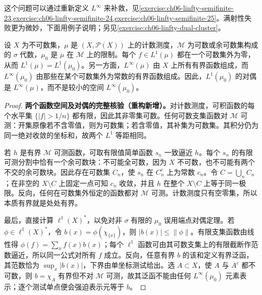 \documentclass[../../main.tex]{subfiles}
\begin{document}
这个问题可以通过重新定义 $L^\infty$ 来补救，见\cref{exercise:ch06-linfty-semifinite-23,exercise:ch06-linfty-semifinite-24,exercise:ch06-linfty-semifinite-25}。满射性失败更为微妙，下面用例子说明；另见\cref{exercise:ch06-linfty-dual-cluster}。
\begin{example}\label{example:ch06-countable-cocountable-dual}
设 $X$ 为不可数集，$\mu$ 是 $(X,\mathscr P(X))$ 上的计数测度，$\mathscr M$ 为可数或余可数集构成的 $\sigma$ 代数，$\mu_0$ 是 $\mu$ 在 $\mathscr M$ 上的限制。每个 $f\in L^1(\mu)$ 都在一个可数集外为零，从而 $L^1(\mu)=L^1(\mu_0)$。另一方面，$L^\infty(\mu)$ 由 $X$ 上所有有界函数组成，而 $L^\infty(\mu_0)$ 由那些在某个可数集外为常数的有界函数组成。因此，$L^1(\mu_0)$ 的对偶是 $L^\infty(\mu)$，而不是较小的空间 $L^\infty(\mu_0)$。
\end{example}
\begin{proof}
\textbf{两个函数空间及对偶的完整核验（重构新增）。}对计数测度，可积函数的每个水平集 $\{|f|>1/n\}$ 都有限，因此其非零集可数。任何可数支集函数对 $\mathscr M$ 可测：开集原像若不含零值，则为可数集；若含零值，其补集为可数集。其积分仍为同一绝对收敛的坐标和，故两个 $L^1$ 等距相同。

若 $h$ 是有界 $\mathscr M$ 可测函数，可取有限值简单函数 $s_n$ 一致逼近 $h$。每个 $s_n$ 的有限可测分割中恰有一个余可数块：不可能全可数，因为 $X$ 不可数，也不可能有两个不交的余可数块。因此存在可数集 $C_n$，使 $s_n$ 在 $C_n^c$ 上为常数 $c_n$。令 $C=\bigcup_n C_n$；在非空的 $X\setminus C$ 上固定一点可知 $c_n$ 收敛，并且 $h$ 在整个 $X\setminus C$ 上等于同一极限。反向，任何在可数集外恒定的函数都对 $\mathscr M$ 可测。计数测度只有空零集，所以本质有界就是处处有界。

最后，直接计算 $\ell^1(X)^*$，以免对非 $\sigma$ 有限的 $\mu_0$ 误用端点对偶定理。若 $\phi\in\ell^1(X)^*$，令 $b(x)=\phi(\chi_{\{x\}})$，则 $|b(x)|\leqslant\|\phi\|$。有限支集函数由线性得 $\phi(f)=\sum_xf(x)b(x)$；每个 $\ell^1$ 函数可由其可数支集上的有限截断作范数逼近，所以同一公式对所有 $f$ 成立。反向，任意有界 $b$ 的该和定义有界泛函，其范数恰为 $\sup_x|b(x)|$，下界由单坐标测试给出。选 $A\subset X$，使 $A$ 与 $A^c$ 都不可数，则 $b=\chi_A$ 有界但不对 $\mathscr M$ 可测，故其泛函不能由任何 $L^\infty(\mu_0)$ 元素表示；逐个测试单点便会强迫表示元等于 $b$。
\end{proof}
\end{document}
